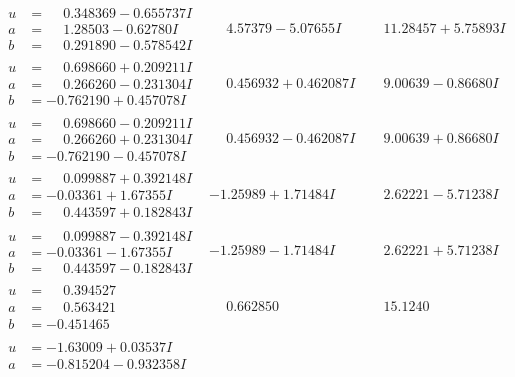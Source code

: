\documentclass[1p]{elsarticle_modified}
\theoremstyle{definition}
\begin{document}
$$\begin{array}{c|c|c}
\begin{aligned}
u &= \phantom{-}0.348369 - 0.655737 I \\
a &= \phantom{-}1.28503 - 0.62780 I \\
b &= \phantom{-}0.291890 - 0.578542 I\end{aligned}
 & \phantom{-}4.57379 - 5.07655 I & \phantom{-}11.28457 + 5.75893 I \\ \hline\begin{aligned}
u &= \phantom{-}0.698660 + 0.209211 I \\
a &= \phantom{-}0.266260 - 0.231304 I \\
b &= -0.762190 + 0.457078 I\end{aligned}
 & \phantom{-}0.456932 + 0.462087 I & \phantom{-}9.00639 - 0.86680 I \\ \hline\begin{aligned}
u &= \phantom{-}0.698660 - 0.209211 I \\
a &= \phantom{-}0.266260 + 0.231304 I \\
b &= -0.762190 - 0.457078 I\end{aligned}
 & \phantom{-}0.456932 - 0.462087 I & \phantom{-}9.00639 + 0.86680 I \\ \hline\begin{aligned}
u &= \phantom{-}0.099887 + 0.392148 I \\
a &= -0.03361 + 1.67355 I \\
b &= \phantom{-}0.443597 + 0.182843 I\end{aligned}
 & -1.25989 + 1.71484 I & \phantom{-}2.62221 - 5.71238 I \\ \hline\begin{aligned}
u &= \phantom{-}0.099887 - 0.392148 I \\
a &= -0.03361 - 1.67355 I \\
b &= \phantom{-}0.443597 - 0.182843 I\end{aligned}
 & -1.25989 - 1.71484 I & \phantom{-}2.62221 + 5.71238 I \\ \hline\begin{aligned}
u &= \phantom{-}0.394527\phantom{ +0.000000I} \\
a &= \phantom{-}0.563421\phantom{ +0.000000I} \\
b &= -0.451465\phantom{ +0.000000I}\end{aligned}
 & \phantom{-}0.662850\phantom{ +0.000000I} & \phantom{-}15.1240\phantom{ +0.000000I} \\ \hline\begin{aligned}
u &= -1.63009 + 0.03537 I \\
a &= -0.815204 - 0.932358 I \\

\end{aligned}
\end{array}$$
\end{document}
